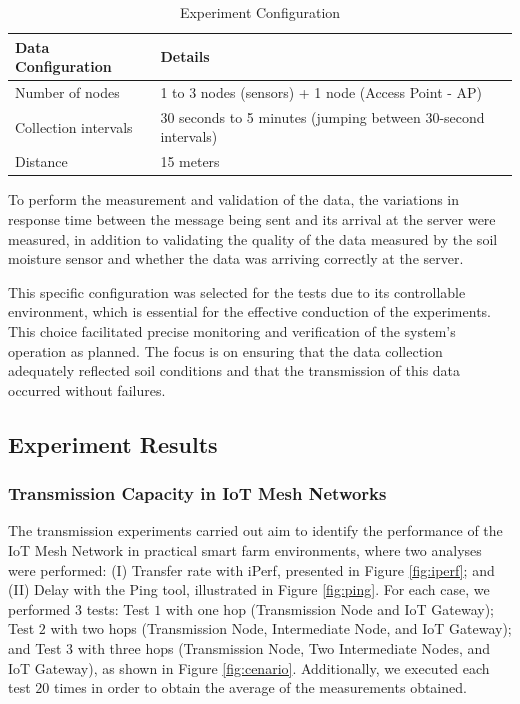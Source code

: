 \documentclass[journal]{IEEEtran}
\begin{document}
\begin{table}[h!]
	\centering
    \caption{Experiment Configuration}
		\begin{tabular}{p{3cm}|p{4.5cm}}\hline
\textbf{Data Configuration}&\textbf{Details}\\\hline\hline
Number of nodes& 1 to 3 nodes (sensors) + 1 node (Access Point - AP)\\\hline
Collection intervals& 30 seconds to 5 minutes (jumping between 30-second intervals)\\ \hline
Distance&15 meters\\ \hline
	\end{tabular}
\label{tab:conf}
\end{table}

To perform the measurement and validation of the data, the variations in response time between the message being sent and its arrival at the server were measured, in addition to validating the quality of the data measured by the soil moisture sensor and whether the data was arriving correctly at the server.

This specific configuration was selected for the tests due to its controllable environment, which is essential for the effective conduction of the experiments. This choice facilitated precise monitoring and verification of the system's operation as planned. The focus is on ensuring that the data collection adequately reflected soil conditions and that the transmission of this data occurred without failures.

\subsection{Experiment Results}
\label{sec:results}

\subsubsection{Transmission Capacity in IoT Mesh Networks}

The transmission experiments carried out aim to identify the performance of the IoT Mesh Network in practical smart farm environments, where two analyses were performed: (I) Transfer rate with iPerf, presented in Figure \ref{fig:iperf}; and (II) Delay with the Ping tool, illustrated in Figure \ref{fig:ping}. For each case, we performed $3$ tests: Test $1$ with one hop (Transmission Node and IoT Gateway); Test $2$ with two hops (Transmission Node, Intermediate Node, and IoT Gateway); and Test $3$ with three hops (Transmission Node, Two Intermediate Nodes, and IoT Gateway), as shown in Figure \ref{fig:cenario}. Additionally, we executed each test $20$ times in order to obtain the average of the measurements obtained.
\end{document}
